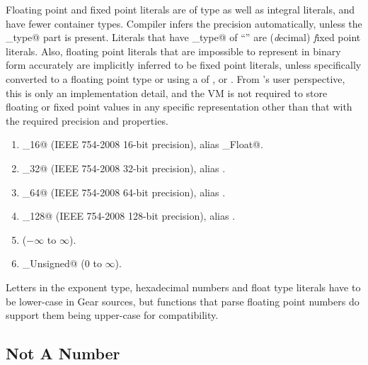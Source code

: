 Floating point and fixed point literals are of type \lstinline@Number@ as well as integral literals, and have fewer container types. Compiler infers the precision automatically, unless the \lstinline@float_type@ part is present. Literals that have \lstinline@float_type@ of ``'' are ({\em d}ecimal) {\em f}ixed point literals. Also, floating point literals that are impossible to represent in binary form accurately are implicitly inferred to be fixed point literals, unless specifically converted to a floating point type or using a  of ,  or . From 's user perspective, this is only an implementation detail, and the VM is not required to store floating or fixed point values in any specific representation other than that with the required precision and properties. 

\begin{enumerate}

  \item \lstinline@Float_16@ (IEEE 754-2008 16-bit precision), alias \lstinline@Half_Float@. 
  
  \item \lstinline@Float_32@ (IEEE 754-2008 32-bit precision), alias \lstinline@Float@. 

  \item \lstinline@Float_64@ (IEEE 754-2008 64-bit precision), alias \lstinline@Double@.

  \item \lstinline@Float_128@ (IEEE 754-2008 128-bit precision), alias \lstinline@Quadruple@.

  \item \lstinline@Decimal@ ($-\infty$ to $\infty$).

  \item \lstinline@Decimal_Unsigned@ ($0$ to $\infty$).

\end{enumerate}

Letters in the exponent type, hexadecimal numbers and float type literals have to be lower-case in Gear sources, but functions that parse floating point numbers do support them being upper-case for compatibility. 





\subsection{Not A Number}
\label{sec:nan}

